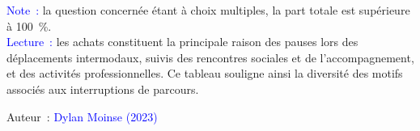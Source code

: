         \begin{table}[h!]
        \centering
        \renewcommand{\arraystretch}{1.5}
    \caption{Raisons avancées pour les 110 pauses déclarées, lors des déplacements intermodaux, par les cyclo-voyageur·se·s.}
    \label{table-chap5:motifs-pauses}
        \vspace{5pt}
        \begin{flushleft}\scriptsize{
        \textcolor{blue}{Note~:} la question concernée étant à choix multiples, la part totale est supérieure à 100~\%.
        \\
        \textcolor{blue}{Lecture~:} les achats constituent la principale raison des pauses lors des déplacements intermodaux, suivis des rencontres sociales et de l'accompagnement, et des activités professionnelles. Ce tableau souligne ainsi la diversité des motifs associés aux interruptions de parcours.
        }\end{flushleft}
        \begin{flushright}\scriptsize{
        Auteur~: \textcolor{blue}{Dylan Moinse (2023)}
        }\end{flushright}
        \end{table}